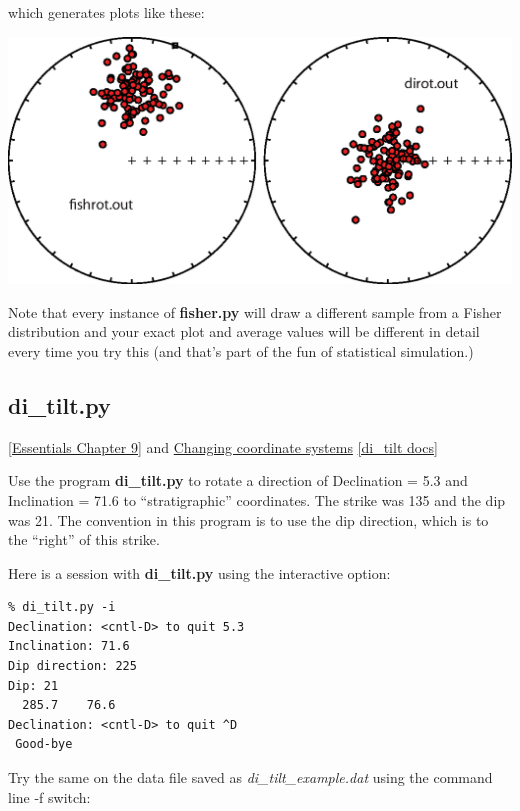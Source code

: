 \documentclass[11pt]{book}
\begin{document}
{{\noindent  which generates plots like these:

\includegraphics[width=15cm]{EPSfiles/dirot.eps}

Note that every instance of {\bf fisher.py} will draw a different sample from a Fisher distribution and your exact plot and average values will be different in detail every time you try this (and that's part of the fun of statistical simulation.)


\subsection{di\_tilt.py}
\href{http://earthref.org/MAGIC/books/Tauxe/Essentials/WebBook3ch9.html#ch9}{[Essentials Chapter 9]} and
\href{http://earthref.org/MAGIC/books/Tauxe/Essentials/WebBook3ap1.html#Changing_coordinate_systems}{Changing coordinate systems}
\href{https://github.com/PmagPy/PmagPy/blob/master/programs/di_tilt.py}{[di\_tilt docs]}


Use the program {\bf di\_tilt.py} to rotate a direction of Declination = 5.3 and Inclination = 71.6 to ``stratigraphic'' coordinates.  The  strike was 135 and the dip was 21.
The convention  in this program is to use  the dip direction, which  is to the ``right'' of
this strike.


Here is  a session with {\bf di\_tilt.py} using the interactive option:

\begin{verbatim}
% di_tilt.py -i
Declination: <cntl-D> to quit 5.3
Inclination: 71.6
Dip direction: 225
Dip: 21
  285.7    76.6
Declination: <cntl-D> to quit ^D
 Good-bye
\end{verbatim}

Try the same on the data file saved as {\it di\_tilt\_example.dat} using the command line -f switch:



}}
\end{document}
